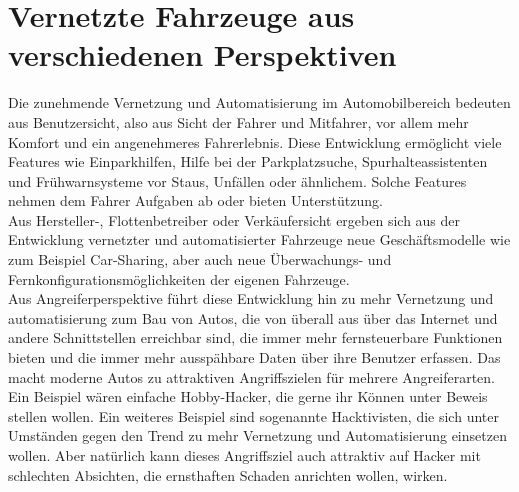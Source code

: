 \section{Vernetzte Fahrzeuge aus verschiedenen Perspektiven}
Die zunehmende Vernetzung und Automatisierung im Automobilbereich bedeuten aus Benutzersicht, also aus Sicht der Fahrer und Mitfahrer, vor allem mehr Komfort und ein angenehmeres Fahrerlebnis. Diese Entwicklung ermöglicht viele Features wie Einparkhilfen, Hilfe bei der Parkplatzsuche, Spurhalteassistenten und Frühwarnsysteme vor Staus, Unfällen oder ähnlichem. Solche Features nehmen dem Fahrer Aufgaben ab oder bieten Unterstützung. \\
Aus Hersteller-, Flottenbetreiber oder Verkäufersicht ergeben sich aus der Entwicklung vernetzter und automatisierter Fahrzeuge neue Geschäftsmodelle wie zum Beispiel Car-Sharing, aber auch neue Überwachungs- und Fernkonfigurationsmöglichkeiten der eigenen Fahrzeuge. \\
Aus Angreiferperspektive führt diese Entwicklung hin zu mehr Vernetzung und automatisierung zum Bau von Autos, die von überall aus über das Internet und andere Schnittstellen erreichbar sind, die immer mehr fernsteuerbare Funktionen bieten und die immer mehr ausspähbare Daten über ihre Benutzer erfassen. Das macht moderne Autos zu attraktiven Angriffszielen für mehrere Angreiferarten. Ein Beispiel wären einfache Hobby-Hacker, die gerne ihr Können unter Beweis stellen wollen. Ein weiteres Beispiel sind sogenannte Hacktivisten, die sich unter Umständen gegen den Trend zu mehr Vernetzung und Automatisierung einsetzen wollen. Aber natürlich kann dieses Angriffsziel auch attraktiv auf Hacker mit schlechten Absichten, die ernsthaften Schaden anrichten wollen, wirken.


